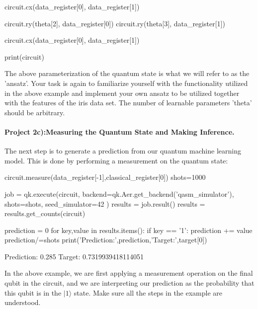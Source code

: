 \documentclass[%
oneside,                 %
final,                   %
10pt]{article}
\begin{document}
circuit.cx(data_register[0], data_register[1])

circuit.ry(theta[2], data_register[0])
circuit.ry(theta[3], data_register[1])

circuit.cx(data_register[0], data_register[1])

print(circuit)

\epycod


The above parameterization of the quantum state is what we will refer
to as the 'ansatz'. Your task is again to familiarize yourself with
the functionality utilized in the above example and implement your own
ansatz to be utilized together with the features of the
iris data set. The number of learnable parameters 'theta'
should be arbitrary.

\paragraph{Project 2c):Measuring the Quantum State and Making Inference.}
The next step is to generate a prediction from our quantum machine learning model. This is done by performing a measurement on the quantum state:



















\bpycod
circuit.measure(data_register[-1],classical_register[0])
shots=1000

job = qk.execute(circuit,
                backend=qk.Aer.get_backend('qasm_simulator'),
                shots=shots,
                seed_simulator=42
                )
results = job.result()
results = results.get_counts(circuit)

prediction = 0
for key,value in results.items():
    if key == '1':
        prediction += value
prediction/=shots
print('Prediction:',prediction,'Target:',target[0])

\epycod



\bpycod
    Prediction: 0.285 Target: 0.7319939418114051

\epycod


In the above example, we are first applying a measurement operation on
the final qubit in the circuit, and we are interpreting our prediction
as the probability that this qubit is in the $\vert 1\rangle$ state. Make
sure all the steps in the example are understood.
\end{document}
